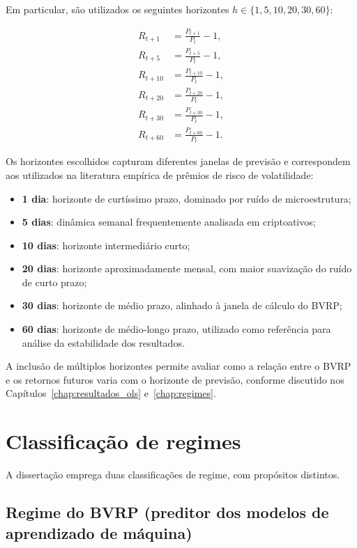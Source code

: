Em particular, são utilizados os seguintes horizontes
$h \in \{1, 5, 10, 20, 30, 60\}$:

\begin{align*}
R_{t+1}  &= \frac{P_{t+1}}{P_t}  - 1, \\
R_{t+5}  &= \frac{P_{t+5}}{P_t}  - 1, \\
R_{t+10} &= \frac{P_{t+10}}{P_t} - 1, \\
R_{t+20} &= \frac{P_{t+20}}{P_t} - 1, \\
R_{t+30} &= \frac{P_{t+30}}{P_t} - 1, \\
R_{t+60} &= \frac{P_{t+60}}{P_t} - 1.
\end{align*}

Os horizontes escolhidos capturam diferentes janelas de
previsão e correspondem aos utilizados na literatura
empírica de prêmios de risco de volatilidade:
\begin{itemize}
    \item \textbf{1 dia}: horizonte de curtíssimo prazo, dominado
    por ruído de microestrutura;
    \item \textbf{5 dias}: dinâmica semanal frequentemente analisada
    em criptoativos;
    \item \textbf{10 dias}: horizonte intermediário curto;
    \item \textbf{20 dias}: horizonte aproximadamente mensal, com
    maior suavização do ruído de curto prazo;
    \item \textbf{30 dias}: horizonte de médio prazo, alinhado à
    janela de cálculo do BVRP;
    \item \textbf{60 dias}: horizonte de médio-longo prazo,
    utilizado como referência para análise da estabilidade
    dos resultados.
\end{itemize}

A inclusão de múltiplos horizontes permite avaliar como
a relação entre o BVRP e os retornos futuros varia com
o horizonte de previsão, conforme discutido nos
Capítulos~\ref{chap:resultados_ols}
e~\ref{chap:regimes}.

\section{Classificação de regimes}

A dissertação emprega duas classificações de regime, com propósitos
distintos.

\subsection{Regime do BVRP (preditor dos modelos de aprendizado de máquina)}

